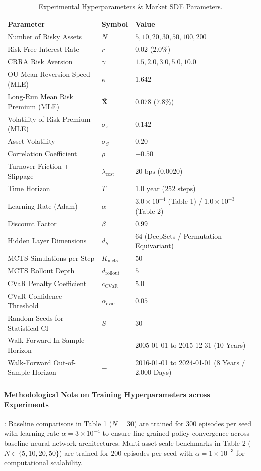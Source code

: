 \documentclass[11pt,a4paper]{article}
\theoremstyle{plain}
\theoremstyle{definition}
\theoremstyle{remark}
\begin{document}
\begin{table}[H]
\centering
\caption{Experimental Hyperparameters \& Market SDE Parameters.}
\label{tab:hyperparams}
\begin{tabular}{lll}
\toprule
\textbf{Parameter} & \textbf{Symbol} & \textbf{Value} \\
\midrule
Number of Risky Assets & $N$ & $5, 10, 20, 30, 50, 100, 200$ \\
Risk-Free Interest Rate & $r$ & $0.02$ ($2.0\%$) \\
CRRA Risk Aversion & $\gamma$ & $1.5, 2.0, 3.0, 5.0, 10.0$ \\
OU Mean-Reversion Speed (MLE) & $\kappa$ & $1.642$ \\
Long-Run Mean Risk Premium (MLE) & $\bar{\mathbf{X}}$ & $0.078$ ($7.8\%$) \\
Volatility of Risk Premium (MLE) & $\sigma_x$ & $0.142$ \\
Asset Volatility & $\sigma_S$ & $0.20$ \\
Correlation Coefficient & $\rho$ & $-0.50$ \\
Turnover Friction + Slippage & $\lambda_{\text{cost}}$ & $20\text{ bps}$ ($0.0020$) \\
Time Horizon & $T$ & $1.0\text{ year}$ ($252\text{ steps}$) \\
Learning Rate (Adam) & $\alpha$ & $3.0 \times 10^{-4}$ (Table 1) / $1.0 \times 10^{-3}$ (Table 2) \\
Discount Factor & $\beta$ & $0.99$ \\
Hidden Layer Dimensions & $d_h$ & $64$ (DeepSets / Permutation Equivariant) \\
MCTS Simulations per Step & $K_{\text{mcts}}$ & $50$ \\
MCTS Rollout Depth & $d_{\text{rollout}}$ & $5$ \\
CVaR Penalty Coefficient & $c_{\text{CVaR}}$ & $5.0$ \\
CVaR Confidence Threshold & $\alpha_{\text{cvar}}$ & $0.05$ \\
Random Seeds for Statistical CI & $S$ & $30$ \\
Walk-Forward In-Sample Horizon & $-$ & 2005-01-01 to 2015-12-31 (10 Years) \\
Walk-Forward Out-of-Sample Horizon & $-$ & 2016-01-01 to 2024-01-01 (8 Years / 2,000 Days) \\
\bottomrule
\end{tabular}

\paragraph{Methodological Note on Training Hyperparameters across Experiments}:
Baseline comparisons in Table 1 ($N=30$) are trained for $300$ episodes per seed with learning rate $\alpha = 3 \times 10^{-4}$ to ensure fine-grained policy convergence across baseline neural network architectures. Multi-asset scale benchmarks in Table 2 ($N \in \{5, 10, 20, 50\}$) are trained for $200$ episodes per seed with $\alpha = 1 \times 10^{-3}$ for computational scalability.
\end{table}
\end{document}
